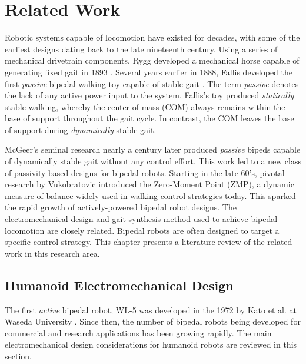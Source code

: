 \chapter{Related Work} %
\label{cha:background}
Robotic systems capable of locomotion have existed for decades, with some of the earliest designs dating back to the late nineteenth century. Using a series of mechanical drivetrain components, Rygg developed a mechanical horse capable of generating fixed gait in 1893 \cite{rygg1893mechanical}. Several years earlier in 1888, Fallis developed the first \emph{passive} bipedal walking toy capable of stable gait \cite{pallis1888fallis}. The term \emph{passive} denotes the lack of any active power input to the system. Fallis's toy produced \emph{statically} stable walking, whereby the center-of-mass (COM) always remains within the base of support throughout the gait cycle. In contrast, the COM leaves the base of support during \emph{dynamically} stable gait. 

McGeer's seminal research \cite{McGeer:1990uk} nearly a century later produced \emph{passive} bipeds capable of dynamically stable gait without any control effort. This work led to a new class of passivity-based designs for bipedal robots. Starting in the late 60's, pivotal research by Vukobratovic \cite{vukobratovic1969} introduced the Zero-Moment Point (ZMP), a dynamic measure of balance widely used in walking control strategies today. This sparked the rapid growth of actively-powered bipedal robot designs. The electromechanical design and gait synthesis method used to achieve bipedal locomotion are closely related. Bipedal robots are often designed to target a specific control strategy. This chapter presents a literature review of the related work in this research area. 





\section{Humanoid Electromechanical Design} %
\label{sec:related_electromechanical_design}
The first \emph{active} bipedal robot, WL-5 was developed in the 1972 by Kato et al. at Waseda University \cite{kato1972hydraulically}. Since then, the number of bipedal robots being developed for commercial and research applications has been growing rapidly. The main electromechanical design considerations for humanoid robots are reviewed in this section. 


